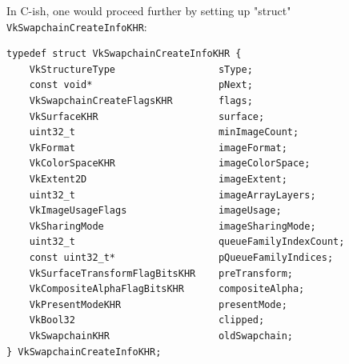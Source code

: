 \documentclass[12pt,letterpaper]{article}
\newcommand{\cil}[1]{\texttt{#1}}
\begin{document}
	In C-ish, one would proceed further by setting up "struct" \cil{VkSwapchainCreateInfoKHR}:
\begin{verbatim}
typedef struct VkSwapchainCreateInfoKHR {
	VkStructureType                  sType;
	const void*                      pNext;
	VkSwapchainCreateFlagsKHR        flags;
	VkSurfaceKHR                     surface;
	uint32_t                         minImageCount;
	VkFormat                         imageFormat;
	VkColorSpaceKHR                  imageColorSpace;
	VkExtent2D                       imageExtent;
	uint32_t                         imageArrayLayers;
	VkImageUsageFlags                imageUsage;
	VkSharingMode                    imageSharingMode;
	uint32_t                         queueFamilyIndexCount;
	const uint32_t*                  pQueueFamilyIndices;
	VkSurfaceTransformFlagBitsKHR    preTransform;
	VkCompositeAlphaFlagBitsKHR      compositeAlpha;
	VkPresentModeKHR                 presentMode;
	VkBool32                         clipped;
	VkSwapchainKHR                   oldSwapchain;
} VkSwapchainCreateInfoKHR;
\end{verbatim}
\end{document}
